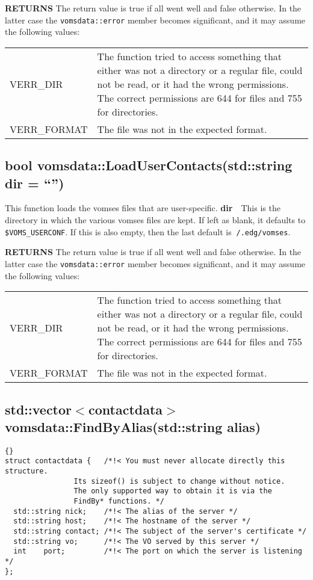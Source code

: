 \documentclass[a4paper]{book}
\newcommand{\return}{\textbf{RETURNS}\newline}
\newcommand{\parameter}[2]{\newline\textbf{#1}\ \ #2}
\begin{document}
\return
The return value is true if all went well and false otherwise.  In the
latter case the \texttt{vomsdata::error} member becomes significant,
and it may assume the following values:

\bigskip\begin{tabular}{lp{3in}}
VERR\_DIR & The function tried to access something that either was not
a directory or a regular file, could not be read, or it had the wrong
permissions.  The correct permissions are 644 for files and 755 for
directories.\\
VERR\_FORMAT & The file was not in the expected format.
\end{tabular}

\subsection{bool vomsdata::LoadUserContacts(std::string dir = ``'')}
This function loads the vomses files that are user-specific.
\parameter{dir}{This is the directory in which the various vomses
files are kept.  If left as blank, it defaults to
\texttt{\$VOMS\_USERCONF}.  If this is also empty, then the last
default is \texttt{$~$/.edg/vomses}.}

\return
The return value is true if all went well and false otherwise.  In the
latter case the \verb|vomsdata::error| member becomes significant,
and it may assume the following values:

\bigskip\begin{tabular}{lp{3in}}
\color{black}VERR\_DIR & \color{black}The function tried to access
something that either was not a directory or a regular file, could not
be read, or it had the wrong permissions.  The correct permissions are
644 for files and 755 for directories.\\ 
VERR\_FORMAT & The file was not in the expected format.\\
\end{tabular}

\subsection{std::vector$<$contactdata$>$ vomsdata::FindByAlias(std::string alias)}

\begin{lstlisting}{}
struct contactdata {   /*!< You must never allocate directly this structure.
			    Its sizeof() is subject to change without notice.
			    The only supported way to obtain it is via the
			    FindBy* functions. */
  std::string nick;    /*!< The alias of the server */
  std::string host;    /*!< The hostname of the server */
  std::string contact; /*!< The subject of the server's certificate */
  std::string vo;      /*!< The VO served by this server */
  int    port;	       /*!< The port on which the server is listening */
};
\end{lstlisting}
\end{document}
